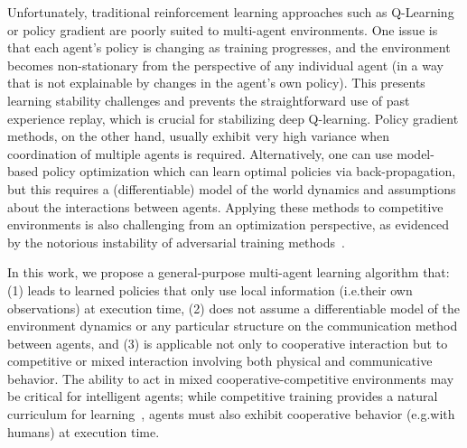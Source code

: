 \documentclass{article}
\newcommand{\comment}[1]{\textbf{\textcolor{red}{comment: #1}}}
\begin{document}

Unfortunately, traditional reinforcement learning approaches such as Q-Learning or policy gradient are poorly suited to multi-agent environments. One issue is that each agent’s policy is changing as training progresses, and the environment becomes non-stationary from the perspective of any individual agent (in a way that is not explainable by changes in the agent's own policy). This presents learning stability challenges and prevents the straightforward use of past experience replay, which is crucial for stabilizing deep Q-learning. Policy gradient methods, on the other hand, usually exhibit very high variance when coordination of multiple agents is required. Alternatively, one can use model-based policy optimization which can learn optimal policies via back-propagation, but this requires a (differentiable) model of the world dynamics and assumptions about the interactions between agents. %
Applying these methods to competitive environments is also challenging from an optimization perspective, as evidenced by the notorious instability of adversarial training methods~\cite{goodfellow2014generative}.

In this work, we propose a general-purpose multi-agent learning algorithm that:
(1) leads to learned policies that only use local information (i.e.\@ their own observations) at execution time, (2) does not assume a differentiable model of the environment dynamics or any particular structure on the communication method between agents, and (3) is applicable not only to cooperative interaction but to competitive or mixed interaction involving both physical and communicative behavior. The ability to act in mixed cooperative-competitive environments may be critical for intelligent agents; while competitive training provides a natural curriculum for learning~\cite{sukhbaatar2017intrinsic}, agents must also exhibit cooperative behavior (e.g.\@ with humans) at execution time.
\end{document}
